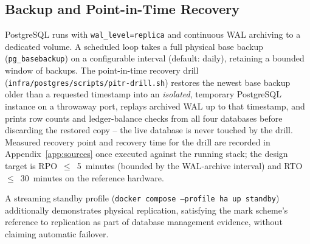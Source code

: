 \subsection{Backup and Point-in-Time Recovery}
PostgreSQL runs with \texttt{wal\_level=replica} and continuous WAL
archiving to a dedicated volume. A scheduled loop takes a full physical base
backup (\texttt{pg\_basebackup}) on a configurable interval (default: daily),
retaining a bounded window of backups. The point-in-time recovery drill
(\texttt{infra/postgres/scripts/pitr-drill.sh}) restores the newest base
backup older than a requested timestamp into an \emph{isolated}, temporary
PostgreSQL instance on a throwaway port, replays archived WAL up to that
timestamp, and prints row counts and ledger-balance checks from all four
databases before discarding the restored copy -- the live database is never
touched by the drill. Measured recovery point and recovery time for the drill
are recorded in Appendix~\ref{app:sources} once executed against the running
stack; the design target is RPO~$\leq$~5~minutes (bounded by the WAL-archive
interval) and RTO~$\leq$~30~minutes on the reference hardware.

A streaming standby profile (\texttt{docker compose --profile ha up standby})
additionally demonstrates physical replication, satisfying the mark scheme's
reference to replication as part of database management evidence, without
claiming automatic failover.
